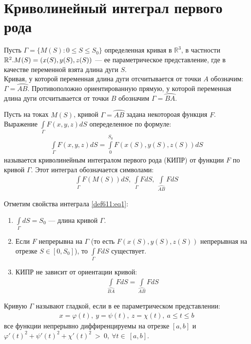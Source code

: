 \section{Криволинейный интеграл первого рода}
Пусть $\Gamma = \{M(S) : 0 \leq S \leq S_0\}$ определенная кривая в
$\mathbb{R}^3$, в частности $\mathbb{R}^2. \\ M(S) = (x(S), y(S), z(S))$ --- ее
параметрическое представление, где в качестве переменной взята длина дуги $S$.
\\
Кривая, у которой переменная длина дуги отсчитывается от точки $A$
обозначим: $\Gamma = \wideparen{AB}$. Противоположно ориентированную прямую, у
которой переменная длина дуги отсчитывается от точки $B$ обозначим $\Gamma =
\wideparen{BA}$.

\begin{definition}
  Пусть на токах $M(S)$, кривой $\Gamma = \wideparen{AB}$ задана некотороая
  функция $F$. Выражение $\int\limits_\Gamma F(x, y, z) dS$ опеределенное по
  формуле:
  \begin{gather}
    \int\limits_\Gamma F(x, y, z) dS = \int\limits_0^{S_0} F(x(S), y(S), z(S))
    dS
    \label{def611:eq1}
  \end{gather}
  называется криволинейным интегралом первого рода (КИПР) от функции $F$ по
  кривой $\Gamma$. Этот интеграл обозначается символами:
  \begin{gather*}
    \int\limits_\Gamma F(M(S)) dS, \ \int\limits_\Gamma F dS, \
    \int\limits_{\wideparen{AB}} FdS
  \end{gather*}
\end{definition}

Отметим свойства интеграла \eqref{def611:eq1}:
\begin{enumerate}
  \item $\int\limits_\Gamma dS = S_0$ --- длина кривой $\Gamma$.
  \item Если $F$ непрерывна на $\Gamma$ (то есть $F(x(S), y(S), z(S))$
    непрерывная на отрезке $S \in [0, S_0]$), то $\int\limits_\Gamma FdS$
    существует.
  \item КИПР не зависит от ориентации кривой:
    \begin{gather*}
      \int\limits_{\wideparen{BA}} FdS = \int\limits_{\wideparen{AB}} FdS
    \end{gather*}
\end{enumerate}

\begin{definition}
  Кривую $\Gamma$ называют гладкой, если в ее параметрическом представлении:
  \begin{gather}
    x = \varphi(t), \ y = \psi(t), \ z = \chi(t), \ a \leq t \leq b
    \label{def612:eq2}
  \end{gather}
  все функции непрерывно диффиренцируемы на отрезке $[a, b]$ и $\varphi'(t)^2 +
  \psi'(t)^2 + \chi'(t)^2~>~0, \ \forall t \in~[a, b]$.
\end{definition}

